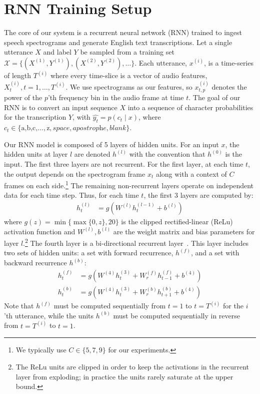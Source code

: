 \section{RNN Training Setup}
\label{sec:deepspeech:model}

The core of our system is a recurrent neural network (RNN) trained to ingest
speech spectrograms and generate English text transcriptions. Let a single
utterance $X$ and label $Y$ be sampled from a training set $\mathcal{X} =
\{(X^{(1)},Y^{(1)}),(X^{(2)},Y^{(2)}),\ldots\}$. Each utterance, $x^{(i)}$, is
a time-series of length $T^{(i)}$ where every time-slice is a vector of audio
features, $X_t^{(i)}, t=1,\ldots,T^{(i)}$. We use spectrograms as our features,
so $x^{(i)}_{t,p}$ denotes the power of the $p$'th frequency bin in the audio
frame at time $t$. The goal of our RNN is to convert an input sequence $X$ into
a sequence of character probabilities for the transcription $Y$, with
$\hat{y_t} = p(c_t \mid x)$, where $c_t \in \{\textrm{a,b,c,}\ldots,\textrm{z},
\textit{space},\textit{apostrophe},\textit{blank}\}$.

Our RNN model is composed of 5 layers of hidden units.  For an input $x$, the
hidden units at layer $l$ are denoted $h^{(l)}$ with the convention that
$h^{(0)}$ is the input. The first three layers are not recurrent. For the first
layer, at each time $t$, the output depends on the spectrogram frame $x_t$
along with a context of $C$ frames on each side.\footnote{We typically use
$C\in \{5, 7, 9\}$ for our experiments.} The remaining non-recurrent layers
operate on independent data for each time step. Thus, for each time $t$, the
first 3 layers are computed by:
\begin{align*}
    h^{(l)}_t &= g(W^{(l)} h^{(l-1)}_t + b^{(l)})
\end{align*}
where $g(z) = \min\{\max\{0,z\}, 20\}$ is the clipped rectified-linear (ReLu)
activation function and $W^{(l)}, b^{(l)}$ are the weight matrix and bias
parameters for layer $l$.\footnote{The ReLu units are clipped in order to keep
the activations in the recurrent layer from exploding; in practice the units
rarely saturate at the upper bound.} The fourth layer is a bi-directional
recurrent layer~\cite{schuster1997bidirectional}. This layer includes two sets
of hidden units: a set with forward recurrence, $h^{(f)}$, and a set with
backward recurrence $h^{(b)}$:
\begin{align*}
    h^{(f)}_t &= g(W^{(4)} h^{(3)}_t + W_r^{(f)} h^{(f)}_{t-1} + b^{(4)}) \\
    h^{(b)}_t &= g(W^{(4)} h^{(3)}_t + W_r^{(b)} h^{(b)}_{t+1} + b^{(4)})
\end{align*}
Note that $h^{(f)}$ must be computed sequentially from $t=1$ to $t=T^{(i)}$ for
the $i$'th utterance, while the units $h^{(b)}$ must be computed sequentially
in reverse from $t=T^{(i)}$ to $t=1$.

